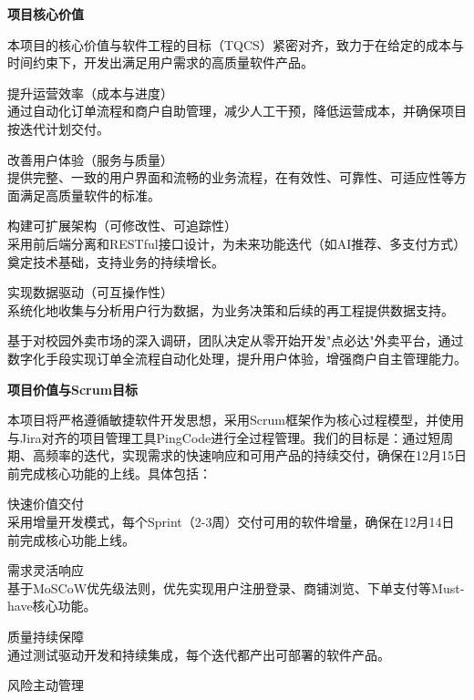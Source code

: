 \begin{levellist}
    \item \textbf{项目核心价值} \par
    \hspace{1.6em} 本项目的核心价值与软件工程的目标（TQCS）紧密对齐，致力于在给定的成本与时间约束下，开发出满足用户需求的高质量软件产品。
    \begin{levellist}
        \item 提升运营效率（成本与进度） \\
        通过自动化订单流程和商户自助管理，减少人工干预，降低运营成本，并确保项目按迭代计划交付。
        \item 改善用户体验（服务与质量） \\
        提供完整、一致的用户界面和流畅的业务流程，在有效性、可靠性、可适应性等方面满足高质量软件的标准。
        \item 构建可扩展架构（可修改性、可追踪性） \\
        采用前后端分离和RESTful接口设计，为未来功能迭代（如AI推荐、多支付方式）奠定技术基础，支持业务的持续增长。
        \item 实现数据驱动（可互操作性） \\
        系统化地收集与分析用户行为数据，为业务决策和后续的再工程提供数据支持。

    \end{levellist}

    \hspace{1.6em} 基于对校园外卖市场的深入调研，团队决定从零开始开发"点必达"外卖平台，通过数字化手段实现订单全流程自动化处理，提升用户体验，增强商户自主管理能力。


    \item \textbf{项目价值与Scrum目标} \par
    \hspace{1.6em}  本项目将严格遵循敏捷软件开发思想，采用Scrum框架作为核心过程模型，并使用与Jira对齐的项目管理工具PingCode进行全过程管理。我们的目标是：通过短周期、高频率的迭代，实现需求的快速响应和可用产品的持续交付，确保在12月15日前完成核心功能的上线。具体包括：
    \begin{levellist}
        \item 快速价值交付 \\
        采用增量开发模式，每个Sprint（2-3周）交付可用的软件增量，确保在12月14日前完成核心功能上线。
        \item 需求灵活响应 \\
        基于MoSCoW优先级法则，优先实现用户注册登录、商铺浏览、下单支付等Must-have核心功能。
        \item 质量持续保障 \\
        通过测试驱动开发和持续集成，每个迭代都产出可部署的软件产品。
        \item 风险主动管理


\end{levellist}
\end{levellist}
